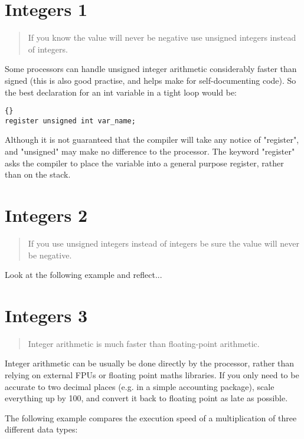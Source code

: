 \documentclass{report}
\begin{document}
\section{Integers 1}
\begin{quote}
If you know the value will never be negative use unsigned integers instead of integers.
\end{quote}
Some processors can handle unsigned integer arithmetic considerably faster than signed (this is also good practise, and helps make for self-documenting code). 
So the best declaration for an int variable in a tight loop would be:
\begin{lstlisting}{}
register unsigned int var_name;
\end{lstlisting}
Although it is not guaranteed that the compiler will take any notice of "register", and "unsigned" may make no difference to the processor.
The keyword "register" asks the compiler to place the variable into a general purpose register, rather than on the stack.

\section{Integers 2}
\begin{quote}
If you use unsigned integers instead of integers be sure the value will never be negative.
\end{quote}
Look at the following example and reflect...




\section{Integers 3}
\begin{quote}
Integer arithmetic is much faster than floating-point arithmetic.
\end{quote}
Integer arithmetic can be usually be done directly by the processor, rather than relying on external FPUs or floating point maths libraries. If you only need to be accurate to two decimal places (e.g. in a simple accounting package), scale everything up by 100, and convert it back to floating point as late as possible.

The following example compares the execution speed of a multiplication of three different data types: 
\end{document}
